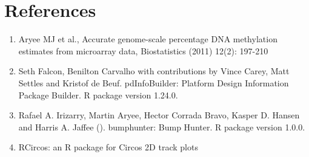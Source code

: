 \documentclass[11pt]{article}
\begin{document}
% 
%
% 


\section*{References}  
\begin{enumerate}


	\item  Aryee MJ et al., Accurate genome-scale percentage DNA methylation estimates
	  from microarray data, Biostatistics (2011) 12(2): 197-210 	

	\item  Seth Falcon, Benilton Carvalho with contributions by Vince Carey, Matt
	  Settles and Kristof de Beuf. pdInfoBuilder: Platform Design Information
	  Package Builder. R package version 1.24.0.
	
	\item   Rafael A. Irizarry, Martin Aryee, Hector Corrada Bravo, Kasper D. Hansen and	Harris A. Jaffee (). bumphunter: Bump Hunter. R package version 1.0.0.
		
	\item RCircos: an R package for Circos 2D track plots
	
	
 \end{enumerate}

 
 
 
 
 
\end{document}
